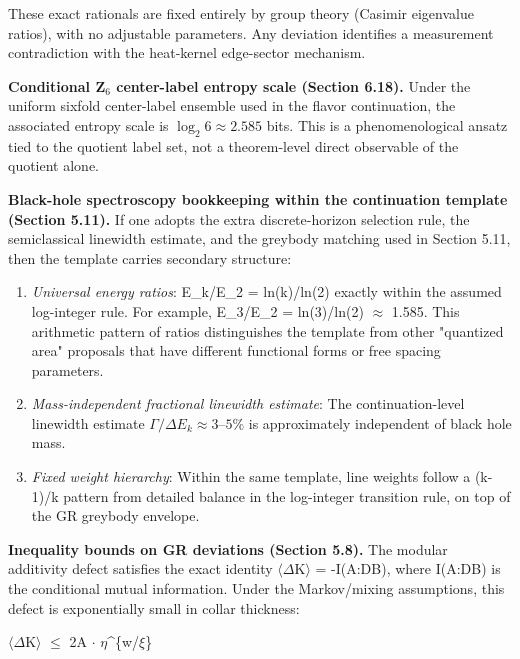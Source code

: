 These exact rationals are fixed entirely by group theory (Casimir eigenvalue ratios), with no adjustable parameters. Any deviation identifies a measurement contradiction with the heat-kernel edge-sector mechanism.

\textbf{Conditional Z$_6$ center-label entropy scale (Section 6.18).} Under the uniform sixfold center-label ensemble used in the flavor continuation, the associated entropy scale is \(\log_2 6 \approx 2.585\) bits. This is a phenomenological ansatz tied to the quotient label set, not a theorem-level direct observable of the quotient alone.

\textbf{Black-hole spectroscopy bookkeeping within the continuation template (Section 5.11).} If one adopts the extra discrete-horizon selection rule, the semiclassical linewidth estimate, and the greybody matching used in Section 5.11, then the template carries secondary structure:

\begin{enumerate}
\def\labelenumi{\arabic{enumi}.}
\item
  \emph{Universal energy ratios}: E\_k/E\_2 = ln(k)/ln(2) exactly within the assumed log-integer rule. For example, E\_3/E\_2 = ln(3)/ln(2) \ensuremath{\approx} 1.585. This arithmetic pattern of ratios distinguishes the template from other "quantized area" proposals that have different functional forms or free spacing parameters.
\item
  \emph{Mass-independent fractional linewidth estimate}: The continuation-level linewidth estimate \(\Gamma/\Delta E_k \approx 3\text{--}5\%\) is approximately independent of black hole mass.
\item
  \emph{Fixed weight hierarchy}: Within the same template, line weights follow a (k-1)/k pattern from detailed balance in the log-integer transition rule, on top of the GR greybody envelope.
\end{enumerate}

\textbf{Inequality bounds on GR deviations (Section 5.8).} The modular additivity defect satisfies the exact identity \ensuremath{\langle}\ensuremath{\Delta}K\ensuremath{\rangle} = -I(A:D\textbar B), where I(A:D\textbar B) is the conditional mutual information. Under the Markov/mixing assumptions, this defect is exponentially small in collar thickness:

\textbar\ensuremath{\langle}\ensuremath{\Delta}K\ensuremath{\rangle}\textbar{} \ensuremath{\leq} 2\textbar A\textbar{} \ensuremath{\cdot} \ensuremath{\eta}\^{}\{w/\ensuremath{\xi}\}

